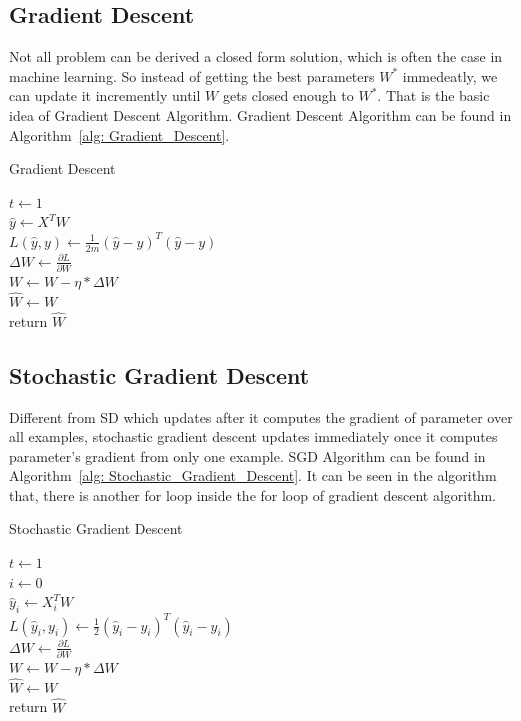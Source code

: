 \documentclass[journal, a4paper]{IEEEtran}
\begin{document}
\subsection{Gradient Descent}
Not all problem can be derived a closed form solution, which is often the case in machine learning. So instead of getting the best parameters $W^{*}$ immedeatly, we can update it incremently until $W$ gets closed enough to $W^{*}$. That is the basic idea of Gradient Descent Algorithm. Gradient Descent Algorithm can be found in Algorithm~\ref{alg: Gradient_Descent}. 
\begin{algorithm}

	\label{alg: Gradient_Descent}
	\caption{Gradient Descent}
	$t \gets 1$ \\
	{
		$\hat{y} \gets X^{T}W $ \\
		$ L(\hat{y}, y) \gets \frac{1}{2m}(\hat{y} - y)^{T}(\hat{y} - y)$ \\
		$\Delta{W} \gets \frac{\partial L}{\partial W}$ \\
		$W \gets W - \eta * \Delta{W}$ \\
	}
	$\hat{W} \gets W$ \\
	return $\hat{W}$
\end{algorithm}

\subsection{Stochastic Gradient Descent}
Different from SD which updates after it computes the gradient of parameter over all examples, stochastic gradient descent updates immediately once it computes parameter's gradient from only one example. SGD Algorithm can be found in Algorithm~\ref{alg: Stochastic_Gradient_Descent}. It can be seen in the algorithm that, there is another for loop inside the for loop of gradient descent algorithm.
\begin{algorithm}
		\label{alg: Stochastic_Gradient_Descent}
	\caption{Stochastic Gradient Descent}
	$t \gets 1$ \\
	{
		$ i \gets 0 $ \\
		{
			$\hat{y}_{i} \gets X^{T}_{i}W $ \\
			$ L(\hat{y}_{i}, y_{i}) \gets \frac{1}{2}(\hat{y}_{i} - y_{i})^{T}(\hat{y}_{i} - y_{i})$ \\
			$\Delta{W} \gets \frac{\partial L}{\partial W}$ \\
			$W \gets W - \eta * \Delta{W}$ \\
		}
	}
	$\hat{W} \gets W$ \\
	return $\hat{W}$
\end{algorithm}
\end{document}
